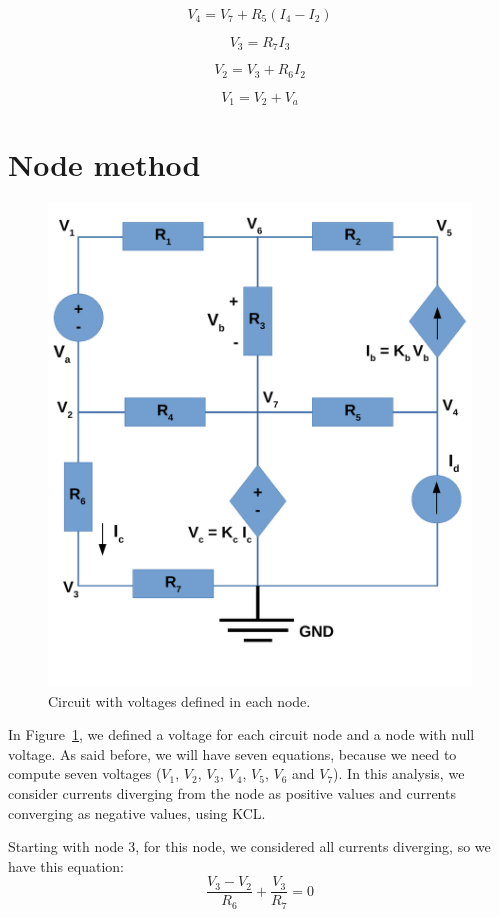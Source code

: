 \begin{equation}
V_4 = V_7 + R_5(I_4 - I_2)
  \label{eq: V4}
\end{equation}

\begin{equation}
V_3 = R_7I_3
  \label{eq: V3}
\end{equation}

\begin{equation}
V_2 = V_3 + R_6I_2
  \label{eq: V2}
\end{equation}

\begin{equation}
V_1 = V_2 + V_a
\label{eq: V1}
\end{equation}

\newpage
\section{Node method}
\begin{figure}[h] \centering
\includegraphics[width=0.6\linewidth]{Circuit_Nodes.pdf}
\caption{Circuit with voltages defined in each node.}
\label{fig:Circuit_Nodes}
\end{figure}
\noindent In Figure~\ref{fig:Circuit_Nodes}, we defined a voltage for each circuit node and a node with null voltage.
As said before, we will have seven equations, because we need to compute seven voltages 
($V_1$, $V_2$, $V_3$, $V_4$, $V_5$, $V_6$ and $V_7$).
In this analysis, we consider currents diverging from the node as positive values and currents converging as negative values, using KCL.

\noindent Starting with node 3, for this node, we considered all currents diverging, so we have this equation:
\begin{equation}
\frac{V_3 - V_2}{R_6} + \frac{V_3}{R_7} = 0
  \label{eq:kvl_node3}
\end{equation}

